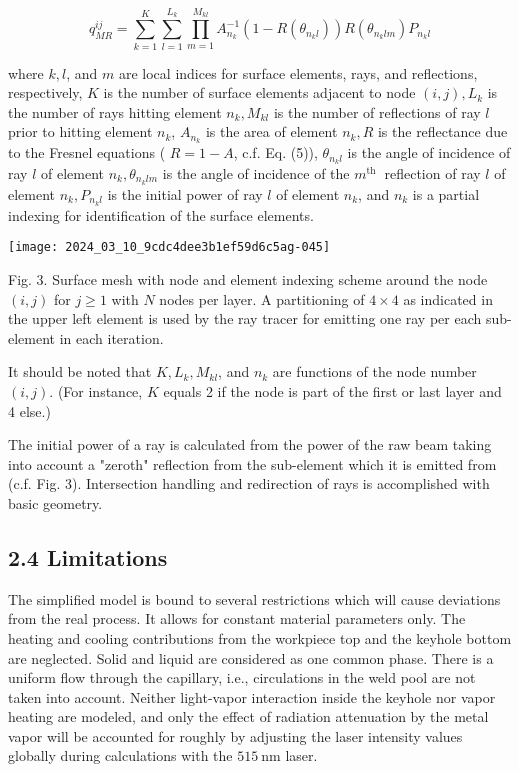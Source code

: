 \documentclass[10pt]{article}
\begin{document}
\begin{equation*}
q_{M R}^{i j}=\sum_{k=1}^{K} \sum_{l=1}^{L_{k}} \prod_{m=1}^{M_{k l}} A_{n_{k}}^{-1}\left(1-R\left(\theta_{n_{k} l}\right)\right) R\left(\theta_{n_{k} l m}\right) P_{n_{k} l} \tag{6}
\end{equation*}


where $k, l$, and $m$ are local indices for surface elements, rays, and reflections, respectively, $K$ is the number of surface elements adjacent to node $(i, j), L_{k}$ is the number of rays hitting element $n_{k}, M_{k l}$ is the number of reflections of ray $l$ prior to hitting element $n_{k}$, $A_{n_{k}}$ is the area of element $n_{k}, R$ is the reflectance due to the Fresnel equations ( $R=1-A$, c.f. Eq. (5)), $\theta_{n_{k} l}$ is the angle of incidence of ray $l$ of element $n_{k}, \theta_{n_{k} l m}$ is the angle of incidence of the $m^{\text {th }}$ reflection of ray $l$ of element $n_{k}, P_{n_{k} l}$ is the initial power of ray $l$ of element $n_{k}$, and $n_{k}$ is a partial indexing for identification of the surface elements.

\begin{center}
\texttt{[image: 2024\_03\_10\_9cdc4dee3b1ef59d6c5ag-045]}
\end{center}

Fig. 3. Surface mesh with node and element indexing scheme around the node $(i, j)$ for $j \geq 1$ with $N$ nodes per layer. A partitioning of $4 \times 4$ as indicated in the upper left element is used by the ray tracer for emitting one ray per each sub-element in each iteration.

It should be noted that $K, L_{k}, M_{k l}$, and $n_{k}$ are functions of the node number $(i, j)$. (For instance, $K$ equals 2 if the node is part of the first or last layer and 4 else.)

The initial power of a ray is calculated from the power of the raw beam taking into account a "zeroth" reflection from the sub-element which it is emitted from (c.f. Fig. 3). Intersection handling and redirection of rays is accomplished with basic geometry.

\subsection*{2.4 Limitations}
The simplified model is bound to several restrictions which will cause deviations from the real process. It allows for constant material parameters only. The heating and cooling contributions from the workpiece top and the keyhole bottom are neglected. Solid and liquid are considered as one common phase. There is a uniform flow through the capillary, i.e., circulations in the weld pool are not taken into account. Neither light-vapor interaction inside the keyhole nor vapor heating are modeled, and only the effect of radiation attenuation by the metal vapor will be accounted for roughly by adjusting the laser intensity values globally during calculations with the $515 \mathrm{~nm}$ laser.
\end{document}
